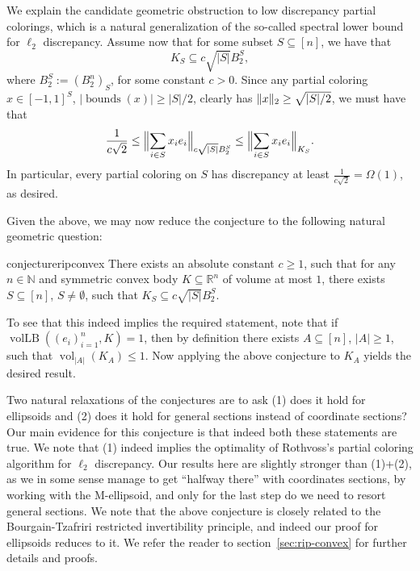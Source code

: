 \documentclass[11pt]{article}
\newcommand{\R}{{\mathbb{R}}}
\newcommand{\N}{{\mathbb{N}}}
\DeclareMathOperator{\vollb}{volLB}
\DeclareMathOperator{\vol}{vol}
\DeclareMathOperator{\bnds}{bounds}
\DeclarePairedDelimiter\norm{\lVert}{\rVert}
\begin{document}
We explain the candidate geometric obstruction to low discrepancy partial
colorings, which is a natural generalization of the so-called spectral lower
bound for $\ell_2$ discrepancy. Assume now that for some subset $S \subseteq
[n]$, we have that 
\begin{equation}
\label{eq:spec-obst-intro}
K_S \subseteq c \sqrt{|S|} B_2^S,
\end{equation}
where $B_2^S := (B_2^n)_S$, for some constant $c > 0$. Since any partial
coloring $x \in [-1,1]^S$, $|\bnds(x)|\geq |S|/2$, clearly has $\norm{x}_2 \geq
\sqrt{|S|/2}$, we must have that
\begin{equation}
\label{eq:spec-lb-intro}
\frac{1}{c\sqrt{2}} 
\leq \Bigl\|\sum_{i \in S} x_i e_i\Bigr\|_{c\sqrt{|S|}B_2^S} 
\leq \Bigl\|\sum_{i \in S} x_i e_i\Bigr\|_{K_S}.
\end{equation}
In particular, every partial coloring on $S$ has discrepancy at least $\tfrac{1}{c
\sqrt{2}} = \Omega(1)$, as desired.

Given the above, we may now reduce the conjecture to the following natural
geometric question:

\begin{restatable}{conjecture}{ripconvex} 
\label{conj:rip-convex}
There exists an absolute constant $c \geq 1$, such that for any $n \in \N$
and symmetric convex body $K \subseteq \R^n$ of volume at most $1$, there exists $S
\subseteq [n]$, $S \neq \emptyset$, such that $K_S \subseteq c\sqrt{|S|}B_2^S$. 
\end{restatable}

To see that this indeed implies the required statement, note that if
$\vollb((e_i)_{i=1}^n,K) = 1$, then by definition there exists $A \subseteq
[n]$, $|A| \geq 1$, such that $\vol_{|A|}(K_A) \leq 1$. Now applying the above
conjecture to $K_A$ yields the desired result. 

Two natural relaxations of the conjectures are to ask (1) does it hold for
ellipsoids and (2) does it hold for general sections instead of coordinate
sections? Our main evidence for this conjecture is that indeed both these
statements are true. We note that (1) indeed implies the optimality of
Rothvoss's partial coloring algorithm for $\ell_2$ discrepancy. Our results here
are slightly stronger than (1)+(2), as we in some sense manage to get ``halfway
there'' with coordinates sections, by working with the M-ellipsoid, and only for
the last step do we need to resort general sections. We note that the above
conjecture is closely related to the Bourgain-Tzafriri restricted invertibility
principle, and indeed our proof for ellipsoids reduces to it. We refer the
reader to section~\ref{sec:rip-convex} for further details and proofs.
\end{document}
